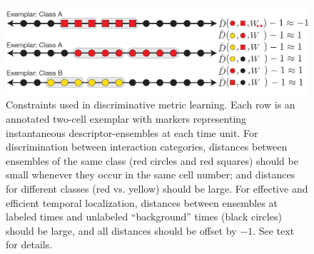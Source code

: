 \begin{figure}[t]
\vspace{-5pt}
\begin{centering}
\includegraphics[width=\columnwidth]{MetricLearning_new}
\end{centering}
\caption{Constraints used in discriminative metric learning. Each row is an annotated two-cell exemplar with markers representing instantaneous descriptor-ensembles at each time unit. For discrimination between interaction categories, distances between ensembles of the same class (red circles and red squares) should be small whenever they occur in the same cell number; and distances for different classes (red vs. yellow) should be large. For effective and efficient temporal localization, distances between ensembles at labeled times and unlabeled ``background'' times (black circles) should be large, and all distances should be offset by $-1$. See text for details.}
\label{ML_illustration}
\vspace{-5pt}
\end{figure}

